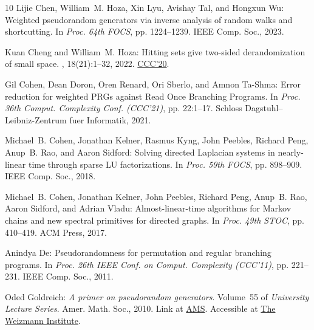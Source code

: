 \begin{thebibliography}{10}
{\sc Lijie Chen, William~M. Hoza, Xin Lyu, Avishay Tal, and Hongxun Wu}:
  Weighted pseudorandom generators via inverse analysis of random walks and
  shortcutting.
\newblock In {\em Proc. 64th FOCS}, pp. 1224--1239. IEEE Comp. Soc., 2023.

{\sc Kuan Cheng and William~M. Hoza}: Hitting sets give two-sided
  derandomization of small space.
, 18(21):1--32, 2022.
\newblock \prelim \href{https://doi.org/10.4230/LIPIcs.CCC.2020.10}{CCC'20}.

{\sc Gil Cohen, Dean Doron, Oren Renard, Ori Sberlo, and Amnon Ta-Shma}: Error
  reduction for weighted {PRGs} against {Read Once Branching Programs}.
\newblock In {\em Proc. 36th Comput. Complexity Conf. (CCC'21)}, pp. 22:1--17.
  Schloss Dagstuhl--Leibniz-Zentrum fuer Informatik, 2021.

{\sc Michael~B. Cohen, Jonathan Kelner, Rasmus Kyng, John Peebles, Richard
  Peng, Anup~B. Rao, and Aaron Sidford}: Solving directed {L}aplacian systems
  in nearly-linear time through sparse {LU} factorizations.
\newblock In {\em Proc. 59th FOCS}, pp. 898--909. IEEE Comp. Soc., 2018.

{\sc Michael~B. Cohen, Jonathan Kelner, John Peebles, Richard Peng, Anup~B.
  Rao, Aaron Sidford, and Adrian Vladu}: Almost-linear-time algorithms for
  {Markov} chains and new spectral primitives for directed graphs.
\newblock In {\em Proc. 49th STOC}, pp. 410--419. ACM Press, 2017.
\newblock [\epfmtdoi{10.1145/3055399.3055463}]

{\sc Anindya De}: Pseudorandomness for permutation and regular branching
  programs.
\newblock In {\em Proc. 26th IEEE Conf. on Comput. Complexity (CCC'11)}, pp.
  221--231. IEEE Comp. Soc., 2011.

{\sc Oded Goldreich}: {\em A primer on pseudorandom generators}.
\newblock Volume~55 of {\em University Lecture Series}.
\newblock Amer. Math. Soc., 2010.
\newblock Link at \href{https://pubs.ams.org/ebooks/ulect/055}{AMS}. Accessible
  at \href{https://www.wisdom.weizmann.ac.il/~oded/PDF/prg10.pdf}{The Weizmann
  Institute}.


\end{thebibliography}
